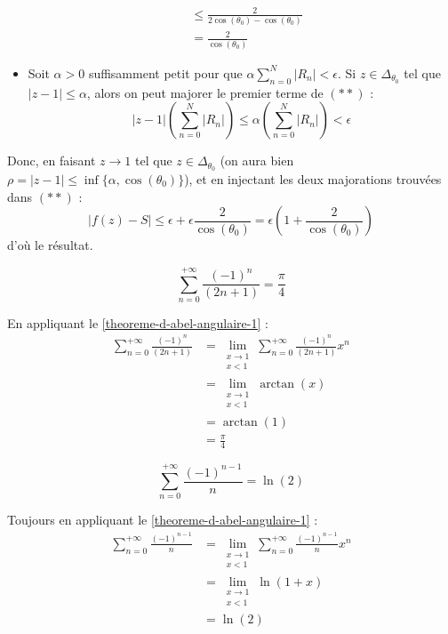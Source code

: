 \begin{demonstration}
\begin{itemize}
\begin{align*}
				&\leq \frac{2}{2\cos(\theta_0) - \cos(\theta_0)} \\
				&= \frac{2}{\cos(\theta_0)}
			\end{align*}
			\item Soit $\alpha > 0$ suffisamment petit pour que $\alpha \sum_{n=0}^N |R_n| < \epsilon$. Si $z \in \Delta_{\theta_0}$ tel que $|z-1| \leq \alpha$, alors on peut majorer le premier terme de $(**)$ :
			\[ |z-1| \left( \sum_{n=0}^N |R_n| \right) \leq \alpha \left( \sum_{n=0}^N |R_n| \right) < \epsilon \]
		\end{itemize}
		Donc, en faisant $z \longrightarrow 1$ tel que $z \in \Delta_{\theta_0}$ (on aura bien $\rho = |z-1| \leq \inf \{ \alpha, \cos(\theta_0) \}$), et en injectant les deux majorations trouvées dans $(**)$ :
		\[ |f(z)-S| \leq \epsilon + \epsilon \frac{2}{\cos(\theta_0)} = \epsilon \left(1 + \frac{2}{\cos(\theta_0)} \right) \]
		d'où le résultat.
	\end{demonstration}

	\begin{application}
		\[ \sum_{n=0}^{+\infty} \frac{(-1)^n}{(2n+1)} = \frac{\pi}{4} \]
	\end{application}

	\begin{demonstration}
		En appliquant le \cref{theoreme-d-abel-angulaire-1} :
		\begin{align*}
			\sum_{n=0}^{+\infty} \frac{(-1)^n}{(2n+1)} &= \lim_{\substack{x \rightarrow 1 \\ x < 1}} \sum_{n=0}^{+\infty} \frac{(-1)^n}{(2n+1)} x^n \\
			&= \lim_{\substack{x \rightarrow 1 \\ x < 1}} \arctan(x) \\
			&= \arctan(1) \\
			&= \frac{\pi}{4}
		\end{align*}
	\end{demonstration}

	\begin{application}
		\[ \sum_{n=0}^{+\infty} \frac{(-1)^{n-1}}{n} = \ln(2) \]
	\end{application}

	\begin{demonstration}
		Toujours en appliquant le \cref{theoreme-d-abel-angulaire-1} :
		\begin{align*}
			\sum_{n=0}^{+\infty} \frac{(-1)^{n-1}}{n} &= \lim_{\substack{x \rightarrow 1 \\ x < 1}} \sum_{n=0}^{+\infty} \frac{(-1)^{n-1}}{n} x^n \\
			&= \lim_{\substack{x \rightarrow 1 \\ x < 1}} \ln(1 + x) \\
			&= \ln(2)
		\end{align*}
	\end{demonstration}

